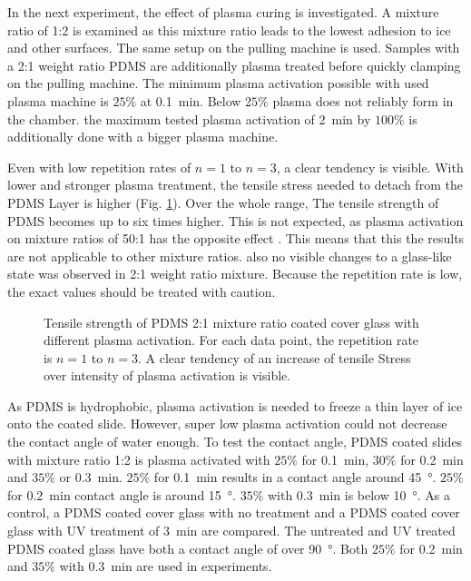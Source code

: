 In the next experiment, the effect of plasma curing is investigated. A mixture ratio of 1:2 is examined as this mixture ratio leads to the lowest adhesion to ice and other surfaces. The same setup on the pulling machine is used. Samples with a 2:1 weight ratio PDMS are additionally plasma treated before quickly clamping on the pulling machine. The minimum plasma activation possible with used plasma machine is $25\%$ at \SI{0.1}{\minute}. Below $25\%$ plasma does not reliably form in the chamber. the maximum tested plasma activation of \SI{2}{\minute} by $100\%$ is additionally done with a bigger plasma machine.

Even with low repetition rates of $n = 1$ to $ n =3$, a clear tendency is visible. With lower and stronger plasma treatment, the tensile stress needed to detach from the PDMS Layer is higher (Fig. \ref{fig:PlotPlasmaAktivierung}). Over the whole range, The tensile strength of PDMS becomes up to six times higher. This is not expected, as plasma activation on mixture ratios of 50:1 has the opposite effect \cite{Ohishi.2017}. This means that this the results are not applicable to other mixture ratios. also no visible changes to a glass-like state was observed in 2:1 weight ratio mixture. Because the repetition rate is low, the exact values should be treated with caution. 

\begin{figure}[hbt!]
	\centering
	
	\caption{Tensile strength of PDMS 2:1 mixture ratio coated cover glass with different plasma activation. For each data point, the repetition rate is $n = 1$ to $ n =3$. A clear tendency of an increase of tensile Stress over intensity of plasma activation is visible.}
	\label{fig:PlotPlasmaAktivierung}
\end{figure}

As PDMS is hydrophobic, plasma activation is needed to freeze a thin layer of ice onto the coated slide. However, super low plasma activation could not decrease the contact angle of water enough. To test the contact angle,  PDMS coated slides with mixture ratio 1:2 is plasma activated with $25\%$ for \SI{0.1}{\minute}, $30\%$ for \SI{0.2}{\minute} and $35\%$ or \SI{0.3}{\minute}. $25\%$ for \SI{0.1}{\minute} results in a contact angle around \SI{45}{\degree}. $25\%$ for \SI{0.2}{\minute} contact angle is around \SI{15}{\degree}. $35\%$ with \SI{0.3}{\minute} is below \SI{10}{\degree}. As a control, a PDMS coated cover glass with no treatment and a PDMS coated cover glass with UV treatment of \SI{3}{\minute} are compared. The untreated and UV treated PDMS coated glass have both a contact angle of over \SI{90}{\degree}. Both $25\%$ for \SI{0.2}{\minute} and $35\%$ with \SI{0.3}{\minute} are used in experiments.


